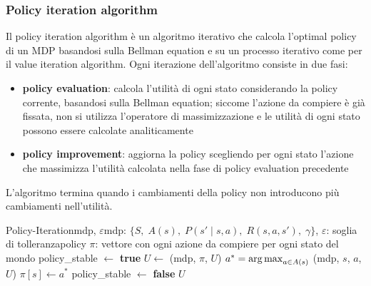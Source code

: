 \subsubsection*{Policy iteration algorithm}
Il policy iteration algorithm è un algoritmo iterativo che calcola l'optimal policy di un MDP basandosi sulla Bellman equation
e su un processo iterativo come per il value iteration algorithm. Ogni iterazione dell'algoritmo consiste in due fasi:
\begin{itemize}
	\item \textbf{policy evaluation}: calcola l'utilità di ogni stato considerando la policy corrente, basandosi sulla Bellman
	equation; siccome l'azione da compiere è già fissata, non si utilizza l'operatore di massimizzazione e le utilità di ogni
	stato possono essere calcolate analiticamente
	\item \textbf{policy improvement}: aggiorna la policy scegliendo per ogni stato l'azione che massimizza l'utilità calcolata
	nella fase di policy evaluation precedente
\end{itemize}
L'algoritmo termina quando i cambiamenti della policy non introducono più cambiamenti nell'utilità.

\begin{algo}{Policy-Iteration}{mdp, $\varepsilon$}{mdp: \(\{S, \; A(s), \; P(s' \mid s, a), \; R(s,a,s'), \; \gamma\}\), $\varepsilon$: soglia di tolleranza}{policy $\pi$: vettore con ogni azione da compiere per ogni stato del mondo}
	\Repeat
		\State policy\_stable \(\gets\) \textbf{true} 
		\State \(U \gets\) (mdp, $\pi$, $U$) 
		 
			\State \(a^* = \operatorname*{arg\,max}_{a \in A(s)}\) (mdp, $s$, $a$, $U$) 
			 
				\State \(\pi[s] \gets a^*\) 
				\State policy\_stable \(\gets\) \textbf{false} 
			\EndIf
		\EndFor
	 
	\State \Return \(U\)
\end{algo}

